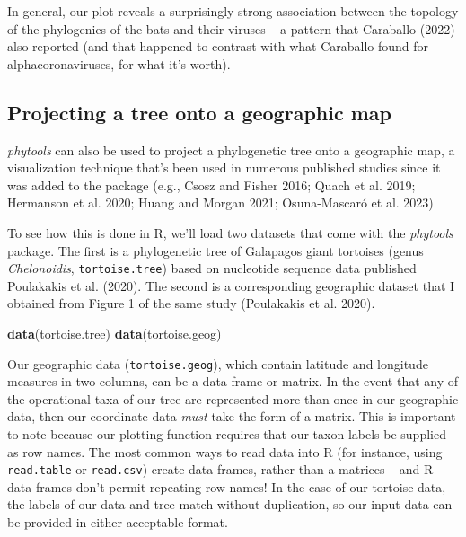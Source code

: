 \documentclass[fleqn,10pt,lineno]{wlpeerj} %
\newenvironment{Shaded}{\begin{snugshade}}{\end{snugshade}}
\newcommand{\FunctionTok}[1]{\textcolor[rgb]{0.13,0.29,0.53}{\textbf{#1}}}
\newcommand{\NormalTok}[1]{#1}
\begin{document}
In general, our plot reveals a surprisingly strong association between the topology of the phylogenies of the bats and their viruses -- a pattern that Caraballo (2022) also reported (and that happened to contrast with what Caraballo found for alphacoronaviruses, for what it's worth).

\hypertarget{projecting-a-tree-onto-a-geographic-map}{%
\subsection{Projecting a tree onto a geographic map}\label{projecting-a-tree-onto-a-geographic-map}}

\emph{phytools} can also be used to project a phylogenetic tree onto a geographic map, a visualization technique that's been used in numerous published studies since it was added to the package (e.g., Csosz and Fisher 2016; Quach et al. 2019; Hermanson et al. 2020; Huang and Morgan 2021; Osuna-Mascaró et al. 2023)

To see how this is done in R, we'll load two datasets that come with the \emph{phytools} package. The first is a phylogenetic tree of Galapagos giant tortoises (genus \emph{Chelonoidis}, \texttt{tortoise.tree}) based on nucleotide sequence data published Poulakakis et al. (2020). The second is a corresponding geographic dataset that I obtained from Figure 1 of the same study (Poulakakis et al. 2020).

\begin{Shaded}
\begin{Highlighting}[]
\FunctionTok{data}\NormalTok{(tortoise.tree)}
\FunctionTok{data}\NormalTok{(tortoise.geog)}
\end{Highlighting}
\end{Shaded}

Our geographic data (\texttt{tortoise.geog}), which contain latitude and longitude measures in two columns, can be a data frame or matrix. In the event that any of the operational taxa of our tree are represented more than once in our geographic data, then our coordinate data \emph{must} take the form of a matrix. This is important to note because our plotting function requires that our taxon labels be supplied as row names. The most common ways to read data into R (for instance, using \texttt{read.table} or \texttt{read.csv}) create data frames, rather than a matrices -- and R data frames don't permit repeating row names! In the case of our tortoise data, the labels of our data and tree match without duplication, so our input data can be provided in either acceptable format.
\end{document}
